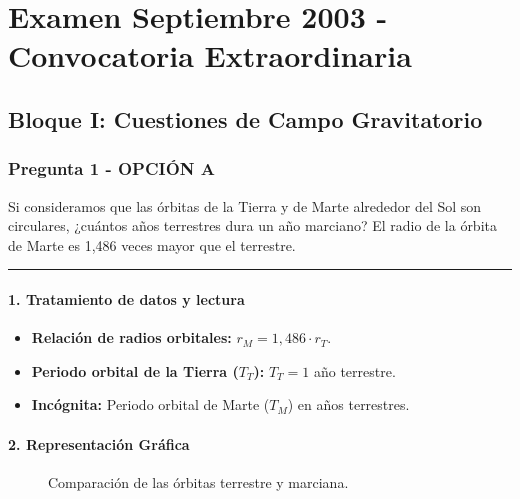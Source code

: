 \chapter{Examen Septiembre 2003 - Convocatoria Extraordinaria}
\label{chap:2003_sep_ext}

\section{Bloque I: Cuestiones de Campo Gravitatorio}
\label{sec:grav_2003_sep_ext}

\subsection{Pregunta 1 - OPCIÓN A}
\label{subsec:1A_2003_sep_ext}

\begin{cajaenunciado}
Si consideramos que las órbitas de la Tierra y de Marte alrededor del Sol son circulares, ¿cuántos años terrestres dura un año marciano? El radio de la órbita de Marte es 1,486 veces mayor que el terrestre.
\end{cajaenunciado}
\hrule

\subsubsection*{1. Tratamiento de datos y lectura}
\begin{itemize}
    \item \textbf{Relación de radios orbitales:} $r_M = 1,486 \cdot r_T$.
    \item \textbf{Periodo orbital de la Tierra ($T_T$):} $T_T = 1$ año terrestre.
    \item \textbf{Incógnita:} Periodo orbital de Marte ($T_M$) en años terrestres.
\end{itemize}

\subsubsection*{2. Representación Gráfica}
\begin{figure}[H]
    \centering
    \caption{Comparación de las órbitas terrestre y marciana.}
\end{figure}

